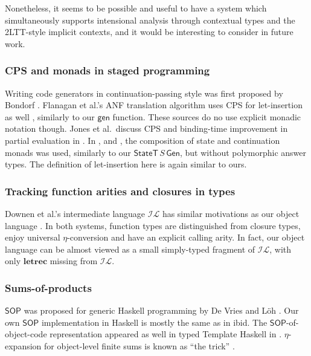 \documentclass[acmsmall]{acmart}
\newcommand{\mit}[1]{{\mathsf{#1}}}
\newcommand{\msf}[1]{{\mathsf{#1}}}
\newcommand{\mbf}[1]{{\mathbf{#1}}}
\newcommand{\SOP}{\msf{SOP}}
\theoremstyle{remark}
\newcommand{\Gen}{\msf{Gen}}
\newcommand{\gen}{\mit{gen}}
\newcommand{\StateT}{\msf{StateT}}
\begin{document}
Nonetheless, it seems to be possible and useful to have a
system which simultaneously supports intensional analysis through contextual
types and the 2LTT-style implicit contexts, and it would be interesting
to consider in future work.

\subsubsection*{CPS and monads in staged programming} Writing code generators
in continuation-passing style was first proposed by Bondorf
\cite{DBLP:conf/lfp/Bondorf92}. Flanagan et al.'s ANF translation algorithm uses
CPS for let-insertion as well \cite{DBLP:conf/pldi/FlanaganSDF93}, similarly to
our $\gen$ function. These sources do no use explicit monadic notation
though. Jones et al.\ discuss CPS and binding-time improvement in partial
evaluation in \cite{partial-evaluation}. In
\cite{DBLP:conf/emsoft/KiselyovST04}, \cite{DBLP:conf/pepm/SwadiTKP06} and
\cite{DBLP:journals/scp/CaretteK11}, the composition of state and continuation
monads was used, similarly to our $\StateT\,S\,\Gen$, but without polymorphic
answer types. The definition of let-insertion here is again similar to ours.

\subsubsection*{Tracking function arities and closures in types} Downen et al.'s
intermediate language $\mathcal{IL}$ has similar motivations as our object
language \cite{DBLP:journals/pacmpl/DownenAJE20}. In both systems, function
types are distinguished from closure types, enjoy universal $\eta$-conversion
and have an explicit calling arity. In fact, our object language can be almost
viewed as a small simply-typed fragment of $\mathcal{IL}$, with only
$\mbf{letrec}$ missing from $\mathcal{IL}$.

\subsubsection*{Sums-of-products} $\SOP$ was proposed for generic Haskell programming
by De Vries and Löh \cite{DBLP:conf/icfp/VriesL14}. Our own $\SOP$
implementation in Haskell is mostly the same as in ibid. The
$\SOP$-of-object-code representation appeared as well in typed Template Haskell
in \cite{DBLP:conf/haskell/PickeringLW20}. $\eta$-expansion for object-level
finite sums is known as ``the trick'' \cite{eta-expansion-trick}.
\end{document}
